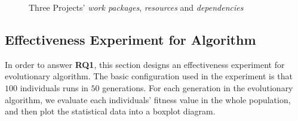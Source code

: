 \begin{figure}[!ht]
  \centering
        \vspace{-5mm}
  \caption{Three Projects' \emph{work packages}, \emph{resources} and \emph{dependencies}}
  \label{fig:dag}
  \vspace{-5mm}
\end{figure}


\subsection{Effectiveness Experiment for Algorithm}
%
In order to answer \textbf{RQ1}, this section designs an effectiveness experiment
for evolutionary algorithm. The basic configuration used in the experiment is
that $100$ individuals runs in $50$ generations. For each generation in the
evolutionary algorithm, we evaluate each individuals' fitness value in the
whole population, and then plot the statistical data into a boxplot diagram.


